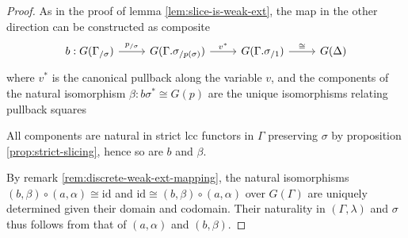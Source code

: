 \documentclass[a4paper]{article}
\theoremstyle{remark}
\theoremstyle{definition}
\begin{document}
\begin{proof}
  As in the proof of lemma \ref{lem:slice-is-weak-ext}, the map in the other direction can be constructed as composite
  \begin{equation}
    \begin{tikzcd}
      b : G(\Gamma_{/ \sigma}) \arrow[r, "p_{/ \sigma}"] & G(\Gamma.\sigma_{/ p(\sigma)}) \arrow[r, "v^*"] & G(\Gamma.\sigma_{/ 1}) \arrow[r, "\cong"] & G(\Delta)
    \end{tikzcd}
  \end{equation}
  where $v^*$ is the canonical pullback along the variable $v$, and the components of the natural isomorphism $\beta : b \sigma^* \cong G(p)$ are the unique isomorphisms relating pullback squares
  All components are natural in strict lcc functors in $\Gamma$ preserving $\sigma$ by proposition \ref{prop:strict-slicing}, hence so are $b$ and $\beta$.

  By remark \ref{rem:discrete-weak-ext-mapping}, the natural isomorphisms $(b, \beta) \circ (a, \alpha) \cong \mathrm{id}$ and $\mathrm{id} \cong (b, \beta) \circ (a, \alpha)$ over $G(\Gamma)$ are uniquely determined given their domain and codomain.
  Their naturality in $(\Gamma, \lambda)$ and $\sigma$ thus follows from that of $(a, \alpha)$ and $(b, \beta)$.
\end{proof}
\end{document}
